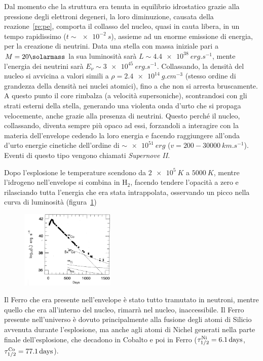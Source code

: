Dal momento che la struttura era tenuta in equilibrio idrostatico grazie alla pressione degli elettroni degeneri, la loro diminuzione, causata della reazione~\ref{re:pe}, comporta il collasso del nucleo, quasi in cauta libera, in un tempo rapidissimo ($t \sim \SI{e-2}{s}$), assieme ad un enorme emissione di energia, per la creazione di neutrini. Data una stella con massa iniziale pari a $M = 20\si{\solarmass}$ la sua luminosità sarà $L \sim \SI{4.4e38}{erg.s^{-1}}$, mente l'energia dei neutrini sarà $E_\nu \sim \SI{3e45}{erg.s^{-1}}$. Collassando, la densità del nucleo si avvicina a valori simili a $\rho = \SI{2.4e14}{g.cm^{-3}}$ (stesso ordine di grandezza della densità nei nuclei atomici), fino a che non si arresta bruscamente. A questo punto il core rimbalza (a velocità supersoniche), scontrandosi con gli strati esterni della stella, generando una violenta onda d'urto che si propaga velocemente, anche grazie alla presenza di neutrini. Questo perché il nucleo, collassando, diventa sempre più opaco ad essi, forzandoli a interagire con la materia dell'envelope cedendo la loro energia e facendo raggiungere all'onda d'urto energie cinetiche dell'ordine di $\sim \SI{e51}{erg}$ ($v = 200-\SI{30000}{km.s^{-1}}$). Eventi di questo tipo vengono chiamati \textit{Supernove II}.

Dopo l'esplosione le temperature scendono da $\SI{2e5}{K}$ a $\SI{5000}{K}$, mentre l'idrogeno nell'envelope si combina in $\mbox{H}_2$, facendo tendere l'opacità a zero e rilasciando tutta l'energia che era stata intrappolata, osservando un picco nella curva di luminosità (figura~\ref{fig:supernova})
\begin{figure}
    \centering
    \includegraphics[width = 0.4\textwidth]{immagini/supernova.png}
    \caption{}\label{fig:supernova}
\end{figure}

Il Ferro che era presente nell'envelope è stato tutto tramutato in neutroni, mentre quello che era all'interno del nucleo, rimarrà nel nucleo, inaccessibile. Il Ferro presente nell'universo è dovuto principalmente alla fusione degli atomi di Silicio avvenuta durante l'esplosione, ma anche agli atomi di Nichel generati nella parte finale dell'esplosione, che decadono in Cobalto e poi in Ferro ($\tau_{1/2}^{\mbox{\scriptsize{Ni}}} = \SI{6.1}{days}$, $\tau_{1/2}^{\mbox{\scriptsize{Co}}} = \SI{77.1}{days}$).
